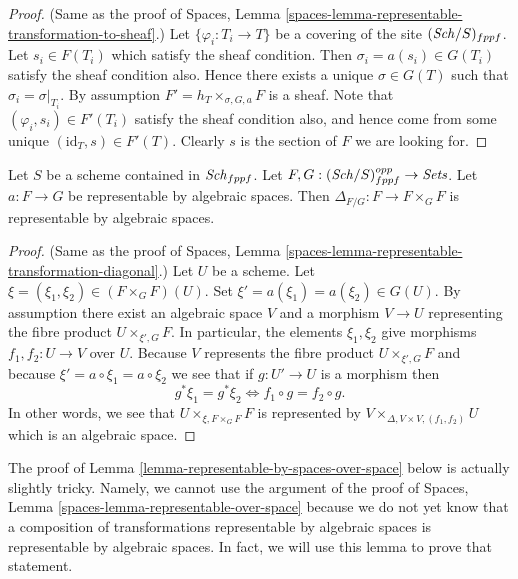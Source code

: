 \begin{proof}
(Same as the proof of
Spaces, Lemma \ref{spaces-lemma-representable-transformation-to-sheaf}.)
Let $\{\varphi_i : T_i \to T\}$ be a covering of the site
$(\mathit{Sch}/S)_{fppf}$.
Let $s_i \in F(T_i)$ which satisfy the sheaf condition.
Then $\sigma_i = a(s_i) \in G(T_i)$ satisfy the sheaf condition
also. Hence there exists a unique $\sigma \in G(T)$ such
that $\sigma_i = \sigma|_{T_i}$. By assumption
$F' = h_T \times_{\sigma, G, a} F$ is a sheaf.
Note that $(\varphi_i, s_i) \in F'(T_i)$ satisfy the
sheaf condition also, and hence come from some unique
$(\text{id}_T, s) \in F'(T)$. Clearly $s$ is the section of
$F$ we are looking for.
\end{proof}

\begin{lemma}
\label{lemma-representable-by-spaces-transformation-diagonal}
Let $S$ be a scheme contained in $\mathit{Sch}_{fppf}$.
Let $F, G : (\mathit{Sch}/S)_{fppf}^{opp} \to \textit{Sets}$.
Let $a : F \to G$ be representable by algebraic spaces.
Then $\Delta_{F/G} : F \to F \times_G F$ is representable by
algebraic spaces.
\end{lemma}

\begin{proof}
(Same as the proof of
Spaces, Lemma \ref{spaces-lemma-representable-transformation-diagonal}.)
Let $U$ be a scheme. Let $\xi = (\xi_1, \xi_2) \in (F \times_G F)(U)$.
Set $\xi' = a(\xi_1) = a(\xi_2) \in G(U)$.
By assumption there exist an algebraic space $V$ and a morphism $V \to U$
representing the fibre product $U \times_{\xi', G} F$.
In particular, the elements $\xi_1, \xi_2$ give morphisms
$f_1, f_2 : U \to V$ over $U$. Because $V$ represents the
fibre product $U \times_{\xi', G} F$ and because
$\xi' = a \circ \xi_1 = a \circ \xi_2$
we see that if $g : U' \to U$ is a morphism then
$$
g^*\xi_1 = g^*\xi_2
\Leftrightarrow
f_1 \circ g = f_2 \circ g.
$$
In other words, we see that $U \times_{\xi, F \times_G F} F$
is represented by $V \times_{\Delta, V \times V, (f_1, f_2)} U$
which is an algebraic space.
\end{proof}

\noindent
The proof of
Lemma \ref{lemma-representable-by-spaces-over-space}
below is actually slightly tricky. Namely,
we cannot use the argument of the proof of
Spaces, Lemma \ref{spaces-lemma-representable-over-space}
because we do not yet know that a composition of transformations
representable by algebraic spaces is representable by algebraic
spaces. In fact, we will use this lemma to prove that statement.

